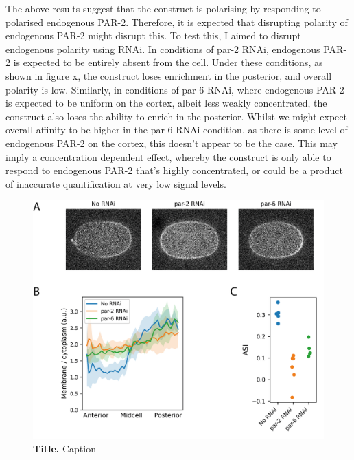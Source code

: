 \documentclass[12pt]{"article"}
\newcommand{\mycaption}[2]{\caption[#1]{\textbf{#1.} #2}}
\begin{document}
The above results suggest that the construct is polarising by responding to polarised endogenous PAR-2. Therefore, it is expected that disrupting polarity of endogenous PAR-2 might disrupt this. To test this, I aimed to disrupt endogenous polarity using RNAi. In conditions of par-2 RNAi, endogenous PAR-2 is expected to be entirely absent from the cell. Under these conditions, as shown in figure x, the construct loses enrichment in the posterior, and overall polarity is low. Similarly, in conditions of par-6 RNAi, where endogenous PAR-2 is expected to be uniform on the cortex, albeit less weakly concentrated, the construct also loses the ability to enrich in the posterior. Whilst we might expect overall affinity to be higher in the par-6 RNAi condition, as there is some level of endogenous PAR-2 on the cortex, this doesn’t appear to be the case. This may imply a concentration dependent effect, whereby the construct is only able to respond to endogenous PAR-2 that’s highly concentrated, or could be a product of inaccurate quantification at very low signal levels.\\

\begin{figure}[!h]
\includegraphics[scale=1]{ph_ring_rnai}
\setlength{\abovecaptionskip}{20pt}
\centering
\mycaption{Title}{Caption}
\end{figure}

\end{document}
